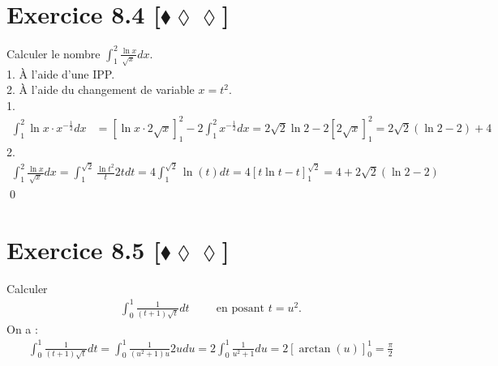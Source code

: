 \documentclass[10pt]{article}
\begin{document}

\section*{Exercice 8.4 [$\blacklozenge\lozenge\lozenge$]}
\begin{tcolorbox}[enhanced, width=7in, center, size=fbox, fontupper=\large, drop shadow southwest]
    Calculer le nombre $\int_1^2{\frac{\ln x}{\sqrt{x}}dx}$.\\
    1. À l'aide d'une IPP.\\
    2. À l'aide du changement de variable $x=t^2$.\\
    1.
    \begin{align*}
        \int_1^2{\ln x\cdot x^{-\frac{1}{2}} dx}&=\left[\ln x \cdot 2\sqrt{x}\right]_1^2 - 2\int_1^2{x^{-\frac{1}{2}}dx}=2\sqrt{2}\ln2-2\left[2\sqrt{x}\right]_1^2=2\sqrt{2}(\ln2-2)+4
    \end{align*}
    2.
    \begin{align*}
        \int_1^2{\frac{\ln x}{\sqrt{x}}dx}=\int_1^{\sqrt{2}}{\frac{\ln t^2}{t}2tdt}=4\int_1^{\sqrt{2}}{\ln(t)dt}=4\left[t\ln t-t\right]_1^{\sqrt{2}}=4+2\sqrt{2}(\ln2-2)
    \end{align*}
    \qed
\end{tcolorbox}


\section*{Exercice 8.5 [$\blacklozenge\lozenge\lozenge$]}
\begin{tcolorbox}[enhanced, width=7in, center, size=fbox, fontupper=\large, drop shadow southwest]
    Calculer
    \begin{align*}
        \int_0^1{\frac{1}{(t+1)\sqrt{t}}dt} \hspace{1cm} \text{en posant }t=u^2.
    \end{align*}
    On a :
    \begin{align*}
       \int_0^1{\frac{1}{(t+1)\sqrt{t}}dt} = \int_0^1{\frac{1}{(u^2+1)u}2udu} = 2\int_0^1{\frac{1}{u^2+1}du}=2\left[\arctan(u)\right]_0^1 = \frac{\pi}{2}
    \end{align*}
\end{tcolorbox}

\end{document}
